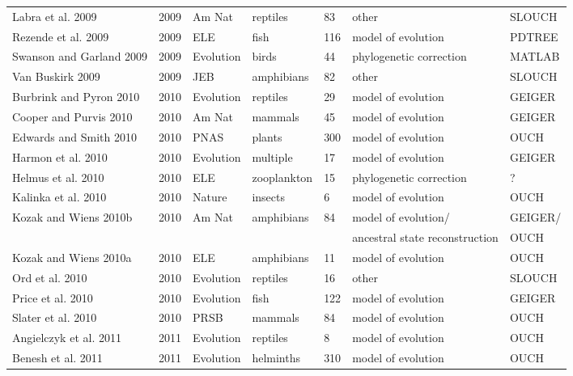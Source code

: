 \documentclass[a4paper,12pt]{article}
\begin{document}
\begin{landscape}
\begin{center}
\begin{longtable}{p{6cm}llllll}
Labra et al. 2009 &   2009    &   Am Nat  &   reptiles    &   83  &   other   &   SLOUCH  \\
Rezende et al. 2009   &   2009    &   ELE &   fish    &   116 &   model of evolution  &   PDTREE  \\
Swanson and Garland 2009  &   2009    &   Evolution   &   birds   &   44  &   phylogenetic correction &   MATLAB  \\
Van Buskirk 2009  &   2009    &   JEB &   amphibians  &   82  &   other   &   SLOUCH  \\
Burbrink and Pyron 2010   &   2010    &   Evolution   &   reptiles    &   29  &   model of evolution  &   GEIGER  \\
Cooper and Purvis 2010    &   2010    &   Am Nat  &   mammals &   45  &   model of evolution  &   GEIGER  \\
Edwards and Smith 2010    &   2010    &   PNAS    &   plants  &   300 &   model of evolution  &   OUCH    \\
Harmon et al. 2010    &   2010    &   Evolution   &   multiple    &   17  &   model of evolution  &   GEIGER  \\
Helmus et al. 2010    &   2010    &   ELE &   zooplankton &   15  &   phylogenetic correction &   ?   \\
Kalinka et al. 2010   &   2010    &   Nature  &   insects &   6   &   model of evolution  &   OUCH    \\
Kozak and Wiens 2010b &   2010    &   Am Nat  &   amphibians  &   84  &   model of evolution/ &   GEIGER/ \\
    &       &       &       &       &   ancestral state reconstruction  &   OUCH    \\
Kozak and Wiens 2010a &   2010    &   ELE &   amphibians  &   11  &   model of evolution  &   OUCH    \\
Ord et al. 2010   &   2010    &   Evolution   &   reptiles    &   16  &   other   &   SLOUCH  \\
Price et al. 2010 &   2010    &   Evolution   &   fish    &   122 &   model of evolution  &   GEIGER  \\
Slater et al. 2010    &   2010    &   PRSB    &   mammals &   84  &   model of evolution  &   OUCH    \\
Angielczyk et al. 2011    &   2011    &   Evolution   &   reptiles    &   8   &   model of evolution  &   OUCH    \\
Benesh et al. 2011    &   2011    &   Evolution   &   helminths   &   310 &   model of evolution  &   OUCH    \\

\end{longtable}
\end{center}
\end{landscape}
\end{document}
